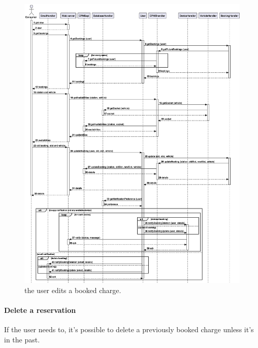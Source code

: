 \begin{figure}[h!]
    \centering
    \includegraphics[width=\columnwidth]{./images/sequences/emsp/book_edit}
    \caption{the user edits a booked charge.}
\end{figure}

\pagebreak

\paragraph{Delete a reservation} If the user needs to, it's possible to delete a previously booked charge unless it's in the past.

